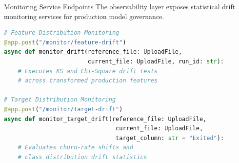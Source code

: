\begin{frame}[fragile]{Monitoring Service Endpoints}
    The observability layer exposes statistical drift monitoring services for production model governance.
    \scriptsize
    \begin{lstlisting}[language=Python]
# Feature Distribution Monitoring
@app.post("/monitor/feature-drift")
async def monitor_drift(reference_file: UploadFile, 
                        current_file: UploadFile, run_id: str):
    # Executes KS and Chi-Square drift tests
    # across transformed production features

# Target Distribution Monitoring
@app.post("/monitor/target-drift")
async def monitor_target_drift(reference_file: UploadFile, 
                                current_file: UploadFile, 
                                target_column: str = "Exited"):
    # Evaluates churn-rate shifts and
    # class distribution drift statistics
    \end{lstlisting}
\end{frame}

